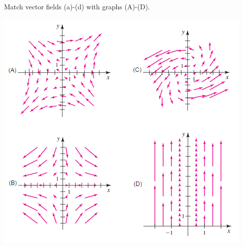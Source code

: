 \documentclass[12pt, addpoints]{exam/exam}
\newcommand{\vect}[1]{\mathbf{#1}}
\theoremstyle{plain}
\begin{document}
\begin{questions}
\newpage

\question[12] %
Match vector fields (a)-(d) with graphs (A)-(D).

\vspace{1pc}

\vspace{1pc}
\includegraphics[scale=1.15]{14-1Exam3}
\end{questions}
\end{document}
